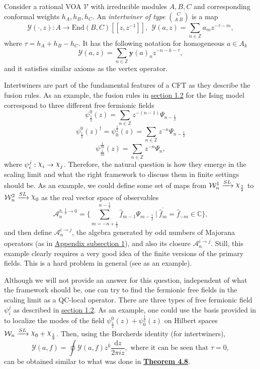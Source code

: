\documentclass[twoside,11pt,titlepage]{amsart}
\renewcommand{\=}[1]{\stackrel{#1}{=}} %
\theoremstyle{definition}
\theoremstyle{remark}
\DeclareRobustCommand{\rchi}{{\mathpalette\irchi\relax}}
\newcommand{\irchi}[2]{\raisebox{\depth}{$#1\chi$}}
\begin{document}
\hfill \break
Consider a rational VOA $\mathcal{V}$ with irreducible modules $A,B,C$ and corresponding conformal weights $h_A,h_B,h_C$. An \textit{intertwiner of type} $\binom{C}{A \ B}$ is a map 
$$\mathscr{Y}(\cdot,z): A \to \text{End}(B,C)[[z,z^{-1}]], \ \ \mathscr{Y}(a,z)=\sum_{n \in \mathbb{Z}}a_mz^{-\tau-m},$$ 
where $\tau=h_A+h_B-h_C$. It has the following notation for homogeneous $a \in A_k$
$$\mathscr{Y}(a,z)=\sum_{n\in \mathbb{Z}}\textbf{y}(a)_nz^{-n-k-\tau},$$
and it satisfies similar axioms as the vertex operator. 

Intertwiners are part of the fundamental features of a CFT as they describe the fusion rules. As an example, the fusion rules in \hyperref[1.2]{section 1.2} for the Ising model correspond to three different free fermionic fields
$$\psi_\frac{1}{2}^0(z)=\sum_{n \in \mathbb{Z}} z^{-(n-1)}\Psi_{n-\frac{1}{2}} $$
$$\psi_\frac{1}{2}^0(z)^\dagger=\psi_0^\frac{1}{2}(z)=\sum_{n \in \mathbb{Z}} z^{-n}\Psi_{n-\frac{1}{2}}$$
$$\psi_\frac{1}{16}^\frac{1}{16}(z)=\sum_{n \in \mathbb{Z}} z^{-n}\Psi_n,$$
where $\psi_i^j : \rchi_i \to \rchi_j$. Therefore, the natural question is how they emerge in the scaling limit and what the right framework to discuss them in finite settings should be. As an example, we could define some set of maps from $\mathcal{W}_n^1 \xrightarrow{SL} \rchi_\frac{1}{2}$ to $\mathcal{W}_n^2 \xrightarrow{SL} \rchi_0$ as the real vector space of observables 
$$\mathcal{A}^{h,\frac{1}{2} \to 0}_n=\{\sum_{m  =-n+\frac{1}{2}}^{n-\frac{1}{2}} \hat{f}_{m-1}\Psi_{m-\frac{1}{2}} \ |  \ \overline{\hat{f}_m}=\hat{f}_{-m} \in \mathbb{C} \},$$
and then define $\mathcal{A}^{i \to j}_n$, the algebra generated by odd numbers of Majorana operators (as in \hyperref[A.1]{Appendix subsection 1}), and also its closure $\overline{\mathcal{A}^{i \to j}_n}$. Still, this example clearly requires a very good idea of the finite versions of the primary fields. This is a hard problem in general (see \cite{mong2014parafermionic} as an example).

Although we will not provide an answer for this question,  independent of what the framework should be, one can try to find the fermionic free fields in the scaling limit as a QC-local operator. There are three types of free fermionic field $\psi_i^j$ as described in \hyperref[1.2]{section 1.2}.  As an example, one could use the basis provided in \cite[section 5]{bravyi2002fermionic} to localize the modes of the field $\psi_\frac{1}{2}^0(z)+\psi_0^\frac{1}{2}(z)$ on Hilbert spaces $\mathcal{W}_n \xrightarrow{SL} \rchi_0+\rchi_\frac{1}{2}$. Then, using the Borcherds identity (for intertwiners),
$$\mathscr{Y}(a,f)=\oint \mathscr{Y}(a,f)z^{k}\frac{\text{d}z}{2\pi i z}, \text{ where it can be seen that }\tau=0, $$
can be obtained similar to what was done in \hyperref[thm4.8]{\textbf{Theorem 4.8}}. 
\end{document}
